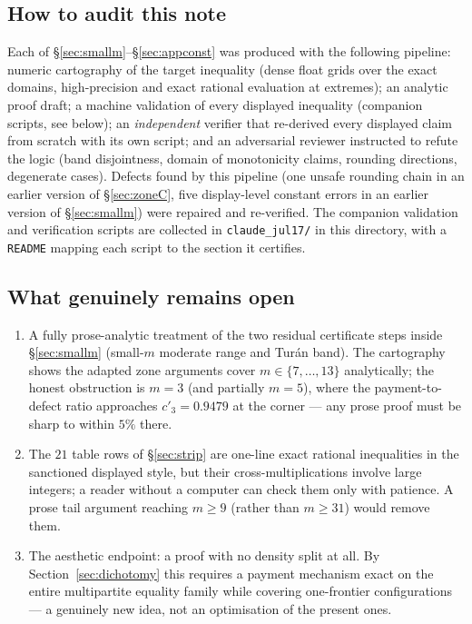 \documentclass[11pt]{article}
\theoremstyle{remark}
\theoremstyle{plain}
\theoremstyle{plain}
\begin{document}
\subsection*{How to audit this note}

Each of \S\ref{sec:smallm}--\S\ref{sec:appconst} was produced with the
following pipeline: numeric cartography of the target inequality (dense
float grids over the exact domains, high-precision and exact rational
evaluation at extremes); an analytic proof draft; a machine validation of
every displayed inequality (companion scripts, see below); an
\emph{independent} verifier that re-derived every displayed claim from
scratch with its own script; and an adversarial reviewer instructed to
refute the logic (band disjointness, domain of monotonicity claims,
rounding directions, degenerate cases).  Defects found by this pipeline
(one unsafe rounding chain in an earlier version of
\S\ref{sec:zoneC}, five display-level constant errors in an earlier
version of \S\ref{sec:smallm}) were repaired and re-verified.  The
companion validation and verification scripts are collected in
\texttt{claude\_jul17/} in this directory, with a \texttt{README}
mapping each script to the section it certifies.

\subsection*{What genuinely remains open}

\begin{enumerate}[label=\textup{(\roman*)},itemsep=2pt]
\item A fully prose-analytic treatment of the two residual certificate
steps inside \S\ref{sec:smallm} (small-$m$ moderate range and Tur\'an
band).  The cartography shows the adapted zone arguments cover
$m\in\{7,\dots,13\}$ analytically; the honest obstruction is $m=3$ (and
partially $m=5$), where the payment-to-defect ratio approaches
$c'_3=0.9479$ at the corner --- any prose proof must be sharp to within
$5\%$ there.
\item The $21$ table rows of \S\ref{sec:strip} are one-line exact
rational inequalities in the sanctioned displayed style, but their
cross-multiplications involve large integers; a reader without a
computer can check them only with patience.  A prose tail argument
reaching $m\ge9$ (rather than $m\ge31$) would remove them.
\item The aesthetic endpoint: a proof with no density split at all.  By
Section~\ref{sec:dichotomy} this requires a payment mechanism exact on
the entire multipartite equality family while covering one-frontier
configurations --- a genuinely new idea, not an optimisation of the
present ones.
\end{enumerate}
\end{document}
